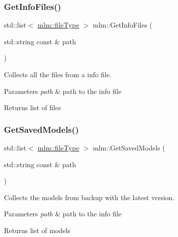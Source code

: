 \subsubsection{\texorpdfstring{Get\+Info\+Files()}{GetInfoFiles()}}
{\footnotesize\ttfamily std\+::list$<$ \mbox{\hyperlink{structmlm_1_1fileType}{mlm\+::file\+Type}} $>$ mlm\+::\+Get\+Info\+Files (\begin{DoxyParamCaption}\item[{std\+::string const \&}]{path }\end{DoxyParamCaption})}



Collects all the files from a info file. 


\begin{DoxyParams}{Parameters}
{\em path} & path to the info file \\
\hline
\end{DoxyParams}
\begin{DoxyReturn}{Returns}
list of files 
\end{DoxyReturn}
\mbox{\label{namespacemlm_a7e5335d56536117373d3d70d7bee0aca}} 
\subsubsection{\texorpdfstring{Get\+Saved\+Models()}{GetSavedModels()}}
{\footnotesize\ttfamily std\+::list$<$ \mbox{\hyperlink{structmlm_1_1fileType}{mlm\+::file\+Type}} $>$ mlm\+::\+Get\+Saved\+Models (\begin{DoxyParamCaption}\item[{std\+::string const \&}]{path }\end{DoxyParamCaption})}



Collects the models from backup with the latest version. 


\begin{DoxyParams}{Parameters}
{\em path} & path to the info file \\
\hline
\end{DoxyParams}
\begin{DoxyReturn}{Returns}
list of models 
\end{DoxyReturn}
\mbox{\label{namespacemlm_a9da3943732b60181527a87eb67fe5cae}} 
